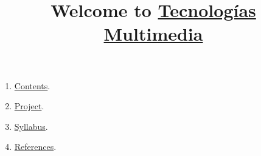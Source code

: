 
%
\title{Welcome to \href{https://www.ual.es/estudios/grados/presentacion/plandeestudios/asignatura/4015/40154321}{Tecnologías Multimedia}}

\maketitle

\begin{enumerate}
\item \href{https://tecnologias-multimedia.github.io/contents}{Contents}.
\item \href{https://github.com/Tecnologias-Multimedia/InterCom}{Project}.
\item \href{https://tecnologias-multimedia.github.io/syllabus}{Syllabus}.
\item \href{https://tecnologias-multimedia.github.io/references}{References}.
\end{enumerate}
